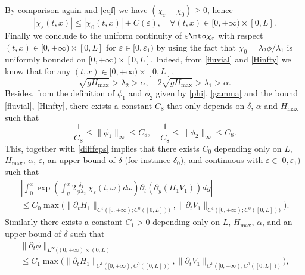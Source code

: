 By {comparison} again and \eqref{eqf} we have $(\chi_{\varepsilon}-\chi_{0})\geq 0$, hence
\begin{equation*}
|\chi_{\varepsilon}(t,x)|\leq |\chi_{0}(t,x)|+ C(\varepsilon),\quad\forall (t,x)\in[0,+\infty)\times[0,L].
\end{equation*}
Finally we conclude to the uniform continuity of $\varepsilon\mto \chi_{\varepsilon}$ with respect $(t,x)\in[0,+\infty)\times[0,L]$ for $\varepsilon \in [0,\varepsilon_{1})$ by using the fact that $\chi_{0}=\lambda_{2}\phi/\lambda_{1}$ is uniformly bounded on $[0,+\infty)\times[0,L]$. Indeed, from \eqref{fluvial} and \eqref{Hinfty} we know that for any $(t,x)\in[0,{+}\infty)\times[0,L]$,
\begin{equation}
\sqrt{g H_{\max}}>\lambda_{2}>\alpha,\quad2\sqrt{gH_{\max}}>\lambda_{1}>\alpha.
\label{bornel1l2}
\end{equation}
Besides, from the definition of $\phi_{1}$ and $\phi_{2}$ given by \eqref{phi}, \eqref{gamma} and the bound \eqref{fluvial}, \eqref{Hinfty}, there exists a constant $C_{8}$ that only depends on
$\delta$, $\alpha$ and $H_{\max}$ such that
\begin{equation}
\frac{1}{C_{8}}\leq\lVert\phi_{1}\rVert_{\infty}\leq C_{8},\quad\frac{1}{C_{8}}\leq\lVert\phi_{2}\rVert_{\infty}\leq C_{8}.
\label{bornephi1phi2}
\end{equation}
This, together with \eqref{difffeps} implies that there exists $C_{0}$ depending only on $L$, $H_{\max}$, $\alpha$, $\varepsilon$, {an upper bound of $\delta$ (for instance $\delta_{0}$),} and continuous with $\varepsilon\in[0,\varepsilon_{1})$ such that
\begin{multline*}
\left|\int_{0}^{x}\exp\left(\int_{y}^{x}2\frac{\delta_{1}}{\phi\lambda_{2}}\,\chi_{\varepsilon}(t,\omega) d\omega\right)\partial_{t}(\partial_{y}(H_{1}V_{1}))dy\right|\\
\leq C_{0} \max \bigl(\lVert\partial_{t}H_{1}\rVert_{C^{1}([0,+\infty);C^{0}([0,L]))},\lVert\partial_{t}V_{1}\rVert_{C^{1}([0,+\infty);C^{0}([0,L]))}\bigr).
\end{multline*}
Similarly
there exists a constant $C_{1}>0$ depending only on $L$, $H_{\max}$, $\alpha${, and an upper bound of $\delta$} such that
\begin{multline}
\label{dphi}
\rVert \partial_{t}{\phi}\lVert_{L^{\infty}((0,+\infty)\times(0,L)}\\
\leq C_{1} \max \bigl(\lVert\partial_{t}H_{1}\rVert_{C^{1}([0,+\infty);C^{0}([0,L]))},\lVert\partial_{t}V_{1}\rVert_{C^{1}([0,+\infty);C^{0}([0,L]))} \bigr),
\end{multline}
